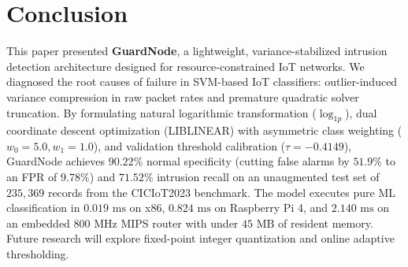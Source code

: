 \documentclass[conference]{IEEEtran}
\begin{document}
\section{Conclusion}
This paper presented \textbf{GuardNode}, a lightweight, variance-stabilized intrusion detection architecture designed for resource-constrained IoT networks. We diagnosed the root causes of failure in SVM-based IoT classifiers: outlier-induced variance compression in raw packet rates and premature quadratic solver truncation. By formulating natural logarithmic transformation ($\log_{1p}$), dual coordinate descent optimization (LIBLINEAR) with asymmetric class weighting ($w_0 = 5.0, w_1 = 1.0$), and validation threshold calibration ($\tau = -0.4149$), GuardNode achieves $90.22\%$ normal specificity (cutting false alarms by $51.9\%$ to an FPR of $9.78\%$) and $71.52\%$ intrusion recall on an unaugmented test set of $235,369$ records from the CICIoT2023 benchmark. The model executes pure ML classification in $0.019\text{ ms}$ on x86, $0.824\text{ ms}$ on Raspberry Pi 4, and $2.140\text{ ms}$ on an embedded 800 MHz MIPS router with under $45\text{ MB}$ of resident memory. Future research will explore fixed-point integer quantization and online adaptive thresholding.
\end{document}
